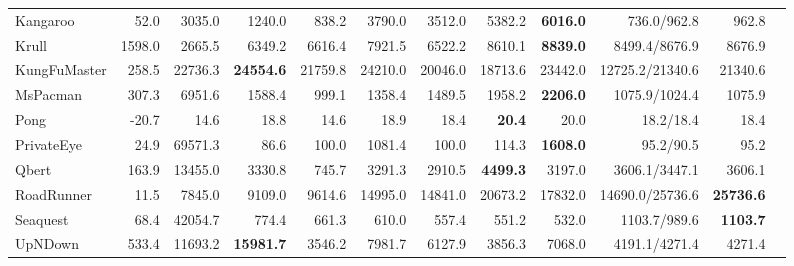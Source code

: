 \documentclass{article}
\begin{document}
\begin{table}[t]
\begin{tabular}{
        l                                %
        rrrrrrrrrrr                   %
    }
Kangaroo               &  52.0      &  3035.0    &  1240.0             &  838.2     &  3790.0      &  3512.0             &  5382.2             &  \textbf{6016.0}    &  736.0/\textcolor{pastelgreen}{962.8}      &  962.8              \\
Krull                  &  1598.0    &  2665.5    &  6349.2             &  6616.4    &  7921.5      &  6522.2             &  8610.1             &  \textbf{8839.0}    &  8499.4/\textcolor{pastelgreen}{8676.9}    &  8676.9             \\
KungFuMaster           &  258.5     &  22736.3   &  \textbf{24554.6}   &  21759.8   &  24210.0     &  20046.0            &  18713.6            &  23442.0            &  12725.2/\textcolor{pastelgreen}{21340.6}  &  21340.6            \\
MsPacman               &  307.3     &  6951.6    &  1588.4             &  999.1     &  1358.4      &  1489.5             &  1958.2             &  \textbf{2206.0}    &  \textcolor{pastelgreen}{1075.9}/1024.4    &  1075.9             \\
Pong                   &  -20.7     &  14.6      &  18.8               &  14.6      &  18.9        &  18.4               &  \textbf{20.4}      &  20.0               &  18.2/\textcolor{pastelgreen}{18.4}        &  18.4               \\
PrivateEye             &  24.9      &  69571.3   &  86.6               &  100.0     &  1081.4      &  100.0              &  114.3              &  \textbf{1608.0}    &  \textcolor{pastelgreen}{95.2}/90.5        &  95.2               \\
Qbert                  &  163.9     &  13455.0   &  3330.8             &  745.7     &  3291.3      &  2910.5             &  \textbf{4499.3}    &  3197.0             &  \textcolor{pastelgreen}{3606.1}/3447.1    &  3606.1             \\
RoadRunner             &  11.5      &  7845.0    &  9109.0             &  9614.6    &  14995.0     &  14841.0            &  20673.2            &  17832.0            &  14690.0/\textcolor{pastelgreen}{25736.6}  &  \textbf{25736.6}   \\
Seaquest               &  68.4      &  42054.7   &  774.4              &  661.3     &  610.0       &  557.4              &  551.2              &  532.0              &  \textcolor{pastelgreen}{1103.7}/989.6     &  \textbf{1103.7}    \\
UpNDown                &  533.4     &  11693.2   &  \textbf{15981.7}   &  3546.2    &  7981.7      &  6127.9             &  3856.3             &  7068.0             &  4191.1/\textcolor{pastelgreen}{4271.4}    &  4271.4             \\

\end{tabular}
\end{table}
\end{document}
